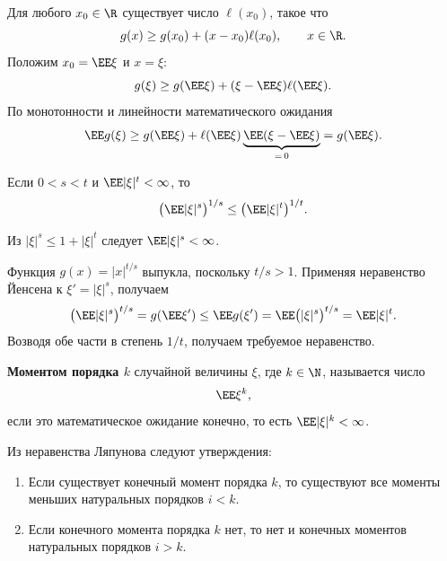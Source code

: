 \begin{Proof}
    Для любого $x_0\in\R$ существует число $\ell(x_0)$, такое что
    \[
        g(x)\geq g(x_0)+(x-x_0)\ell(x_0),\qquad x\in\R.
    \]
    Положим $x_0=\EE\xi$ и $x=\xi$:
    \[
        g(\xi)\geq g(\EE\xi)+(\xi-\EE\xi)\ell(\EE\xi).
    \]
    По монотонности и линейности математического ожидания
    \[
        \EE g(\xi)\geq g(\EE\xi)
        +\ell(\EE\xi)\underbrace{\EE(\xi-\EE\xi)}_{=\,0}
        =g(\EE\xi).
    \]
\end{Proof}

\begin{theorem}
    Если $0<s<t$ и $\EE|\xi|^t<\infty$, то
    \[
        \bigl(\EE|\xi|^s\bigr)^{1/s}
        \leq\bigl(\EE|\xi|^t\bigr)^{1/t}.
    \]
\end{theorem}

\begin{Proof}
    Из $|\xi|^s\leq1+|\xi|^t$ следует $\EE|\xi|^s<\infty$.

    \smallskip
    Функция $g(x)=|x|^{t/s}$ выпукла, поскольку $t/s>1$.
    Применяя неравенство Йенсена к $\xi'=|\xi|^s$, получаем
    \[
        \bigl(\EE|\xi|^s\bigr)^{t/s}
        =g(\EE\xi')\leq\EE g(\xi')
        =\EE\bigl(|\xi|^s\bigr)^{t/s}=\EE|\xi|^t.
    \]
    Возводя обе части в степень $1/t$, получаем требуемое неравенство.
\end{Proof}


\begin{definition}
    \textbf{Моментом порядка $k$} случайной величины $\xi$, где
    $k\in\N$, называется число
    \[
        \EE\xi^k,
    \]
    если это математическое ожидание конечно, то есть
    $\EE|\xi|^k<\infty$.
\end{definition}

\begin{consequence}
    Из неравенства Ляпунова следуют утверждения:
    \begin{enumerate}
        \item Если существует конечный момент порядка $k$, то существуют
        все моменты меньших натуральных порядков $i<k$.
        \item Если конечного момента порядка $k$ нет, то нет и конечных
        моментов натуральных порядков $i>k$.
    \end{enumerate}
\end{consequence}

